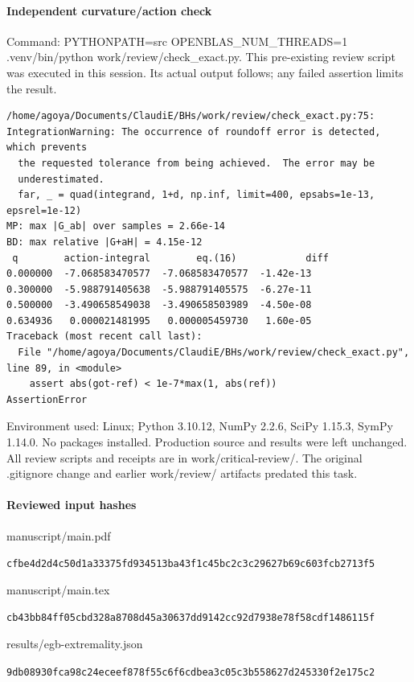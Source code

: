 \documentclass[10pt,a4paper]{article}
\begin{document}
\paragraph{Independent curvature/action check} Command: PYTHONPATH=src OPENBLAS\_NUM\_THREADS=1 .venv/bin/python work/review/check\_exact.py. This pre-existing review script was executed in this session. Its actual output follows; any failed assertion limits the result.
\begin{Verbatim}[fontsize=\scriptsize]
/home/agoya/Documents/ClaudiE/BHs/work/review/check_exact.py:75: IntegrationWarning: The occurrence of roundoff error is detected, which prevents 
  the requested tolerance from being achieved.  The error may be 
  underestimated.
  far, _ = quad(integrand, 1+d, np.inf, limit=400, epsabs=1e-13, epsrel=1e-12)
MP: max |G_ab| over samples = 2.66e-14
BD: max relative |G+aH| = 4.15e-12
 q        action-integral        eq.(16)            diff
0.000000  -7.068583470577  -7.068583470577  -1.42e-13
0.300000  -5.988791405638  -5.988791405575  -6.27e-11
0.500000  -3.490658549038  -3.490658503989  -4.50e-08
0.634936   0.000021481995   0.000005459730   1.60e-05
Traceback (most recent call last):
  File "/home/agoya/Documents/ClaudiE/BHs/work/review/check_exact.py", line 89, in <module>
    assert abs(got-ref) < 1e-7*max(1, abs(ref))
AssertionError

\end{Verbatim}
Environment used: Linux; Python 3.10.12, NumPy 2.2.6, SciPy 1.15.3, SymPy 1.14.0. No packages installed. Production source and results were left unchanged. All review scripts and receipts are in work/critical-review/. The original .gitignore change and earlier work/review/ artifacts predated this task.
\paragraph{Reviewed input hashes}
manuscript/main.pdf\par\texttt{cfbe4d2d4c50d1a33375fd934513ba43}\linebreak\texttt{f1c45bc2c3c29627b69c603fcb2713f5}


manuscript/main.tex\par\texttt{cb43bb84ff05cbd328a8708d45a30637}\linebreak\texttt{dd9142cc92d7938e78f58cdf1486115f}


results/egb-extremality.json\par\texttt{9db08930fca98c24eceef878f55c6f6c}\linebreak\texttt{dbea3c05c3b558627d245330f2e175c2}
\end{document}
